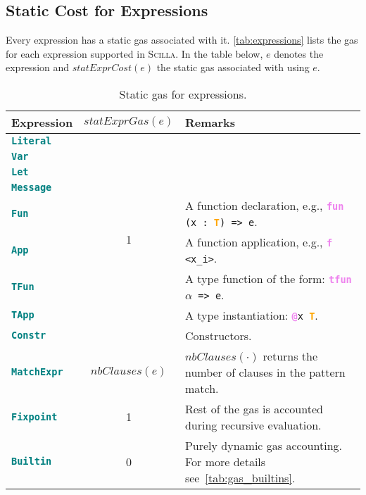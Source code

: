 \documentclass[10pt]{article}
\begin{document}
\subsection{Static Cost for Expressions}

Every expression has a static gas associated with it.
\autoref{tab:expressions} lists the gas for each expression supported in
\textsc{Scilla}. In the table below, $e$ denotes the expression and
$statExprCost(e)$ the static gas associated with using $e$.

\begin{table}[!hbt]
	\caption{Static gas for expressions. \label{tab:expressions} }
\centering
	\begin{tabular}{|l|c|p{10.0cm}|}
	\hline
		\textbf{Expression} & \textbf{$statExprGas(e)$} & \textbf{Remarks} \\ \hline
		\textbf{\texttt{\textcolor{teal}{Literal}}}  & \multirow{9}{*}{1}  & \\
		\cline{1-1} \cline{3-3}
		\textbf{\texttt{\textcolor{teal}{Var}}}  &  & \\ \cline{1-1}\cline{3-3}

		\textbf{\texttt{\textcolor{teal}{Let}}}  &  & \\ \cline{1-1}\cline{3-3}

		\textbf{\texttt{\textcolor{teal}{Message}}}  &  & \\ \cline{1-1}\cline{3-3}
		\textbf{\texttt{\textcolor{teal}{Fun}}}  &  & A function declaration, e.g., \texttt{\textbf{\textcolor{violet}{fun}} (x : \textbf{\textcolor{orange}{T}}) => e}. \\ \cline{1-1} \cline{3-3}
		\textbf{\texttt{\textcolor{teal}{App}}}  &  & A function application, e.g.,
			\texttt{\textbf{\textcolor{violet}{f}} <x\_i>}. \\ \cline{1-1}\cline{3-3}

			\textbf{\texttt{\textcolor{teal}{TFun}}}  &  & A type function of
			the form: \texttt{\textbf{\textcolor{violet}{tfun}} $\alpha$ => e}. \\ \cline{1-1}\cline{3-3}

			\textbf{\texttt{\textcolor{teal}{TApp}}}  &  & A type
			instantiation: \texttt{\textbf{\textcolor{violet}{@}}x
			\textbf{\textcolor{orange}{T}}}. \\ \cline{1-1}\cline{3-3}

			\textbf{\texttt{\textcolor{teal}{Constr}}}  &  & Constructors. \\ \hline
			\textbf{\texttt{\textcolor{teal}{MatchExpr}}}  & $nbClauses(e)$
		&$nbClauses(\cdot)$ returns the number of clauses in the pattern match.
		 \\ \hline
	   \textbf{\texttt{\textcolor{teal}{Fixpoint}}}  & 1  & Rest of the gas is
		accounted during recursive evaluation. \\ \hline
		\textbf{\texttt{\textcolor{teal}{Builtin}}}  & 0 & Purely dynamic gas
		accounting. For more details see~\autoref{tab:gas_builtins}. \\ \hline
	\end{tabular}
	\end{table}
 
\end{document}
